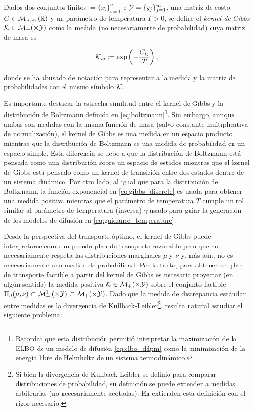 \begin{defn}
	Dados dos conjuntos finitos	$\xspace=\{x_i\}_{i=1}^n$ e $\mathcal{Y}=\{y_j\}_{j=1}^m$, una matriz de costo $C\in\mathcal{M}_{n,m}\left(\mathbb{R}\right)$ y un parámetro de temperatura $T>0$, se define el \textit{kernel de Gibbs} $\mathcal{K}\in\mathcal{M}_+(\times\mathcal{Y})$ como la medida (no necesariamente de probabilidad) cuya matriz de masa es

	\begin{equation}
		\label{eq:gibbs_discrete}
		\mathcal{K}_{ij} := \exp\left(-\frac{C_{ij}}{T}\right),
	\end{equation}

	donde se ha abusado de notación para representar a la medida y la matriz de probabilidades con el mismo símbolo $\mathcal{K}$.
\end{defn}

Es importante destacar la estrecha similitud entre el kernel de Gibbs y la distribución de Boltzmann definida en \eqref{eq:boltzmann}\footnote{Recordar que esta distribución permitió interpretar la maximización de la ELBO de un modelo de difusión \eqref{eq:elbo_ddpm} como la minimización de la energía libre de Helmholtz de un sistema termodinámico.}. Sin embargo, aunque ambas son medidas con la misma función de masa (salvo constante multiplicativa de normalización), el kernel de Gibbs es una medida en un espacio producto mientras que la distribución de Boltzmann es una medida de probabilidad en un espacio simple. Esta diferencia se debe a que la distribución de Boltzmann está pensada como una distribución sobre un espacio de estados mientras que el kernel de Gibbs está pensado como un kernel de transición entre dos estados dentro de un sistema dinámico. Por otro lado, al igual que para la distribución de Boltzmann, la función exponencial en \eqref{eq:gibbs_discrete} es usada para obtener una medida positiva mientras que el parámetro de temperatura $T$ cumple un rol similar al parámetro de temperatura (inversa) $\gamma$ usado para guiar la generación de los modelos de difusión en \eqref{eq:guidance_temperature}.

Desde la perspectiva del transporte óptimo, el kernel de Gibbs puede interpretarse como un pseudo plan de transporte razonable pero que no necesariamente respeta las distribuciones marginales $\mu$ y $\nu$ y, más aún, no es necesariamente una medida de probabilidad. Por lo tanto, para obtener un plan de transporte factible a partir del kernel de Gibbs es necesario proyectar (en algún sentido) la medida positiva $\mathcal{K}\in\mathcal{M}_+(\times\mathcal{Y})$ sobre el conjunto factible $\Pi_d(\mu,\nu)\subset\probmeasure{\xspace\times\yspace}\subset\mathcal{M}_+(\xspace\times\yspace)$. Dado que la medida de discrepancia estándar entre medidas es la divergencia de Kullback-Leibler\footnote{Si bien la divergencia de Kullback-Leibler se definió para comparar distribuciones de probabilidad, su definición se puede extender a medidas arbitrarias (no necesariamente acotadas). En \cite{léonard2013survey} extienden esta definición con el rigor necesario.}, resulta natural estudiar el siguiente problema:

